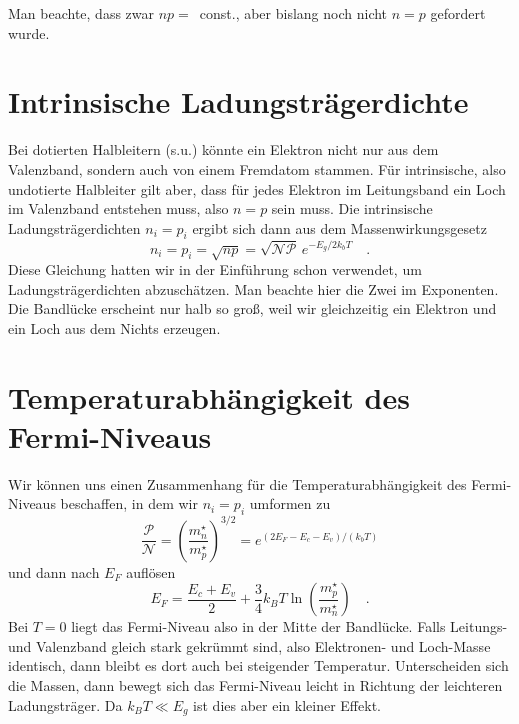 Man beachte, dass zwar  $n p = $~const., aber bislang noch nicht $n=p$ gefordert wurde.


\section{Intrinsische Ladungsträgerdichte}

Bei dotierten Halbleitern (s.u.) könnte ein  Elektron nicht nur aus dem Valenzband,  sondern auch von einem  Fremdatom stammen. 
Für intrinsische, also undotierte Halbleiter gilt aber, dass für jedes Elektron im Leitungsband ein Loch im Valenzband entstehen muss, also $n=p$ sein muss. Die intrinsische  Ladungsträgerdichten $n_i = p_i$ ergibt sich dann aus  dem Massenwirkungsgesetz
\begin{equation}
    n_i = p_i = \sqrt{n p} = \sqrt{\mathcal{N}\mathcal{P}} \, e^{- E_g / 2 k_b T} \quad .
\end{equation}
Diese Gleichung hatten wir in der Einführung schon verwendet, um Ladungsträgerdichten abzuschätzen. Man beachte hier die Zwei im Exponenten. Die Bandlücke erscheint nur halb so groß, weil wir gleichzeitig ein Elektron und ein Loch aus dem Nichts erzeugen.



\section{Temperaturabhängigkeit des Fermi-Niveaus}

Wir können uns einen Zusammenhang für die Temperaturabhängigkeit des Fermi-Niveaus beschaffen, in dem wir $n_i = p_i$ umformen zu
\begin{equation}
    \frac{\mathcal{P}}{\mathcal{N}} = \left( \frac{m^\star_n}{m^\star_p} \right)^{3/2} = e^{(2 E_F - E_c - E_v)/(k_b T)}
\end{equation}
und dann nach $E_F$ auflösen
\begin{equation}
    E_F = \frac{E_c + E_v}{2} + \frac{3}{4} k_B T \ln \left( \frac{m^\star_p}{m^\star_n} \right) \quad . \label{eq:5_Efermi_intr}
\end{equation}
Bei $T=0$ liegt das Fermi-Niveau also in der Mitte der Bandlücke. Falls Leitungs- und Valenzband gleich stark gekrümmt sind, also Elektronen- und Loch-Masse identisch, dann bleibt es dort auch bei steigender Temperatur. Unterscheiden sich die Massen, dann bewegt sich das Fermi-Niveau leicht in Richtung der leichteren Ladungsträger. Da $k_B T \ll E_g$ ist dies aber ein kleiner Effekt.



